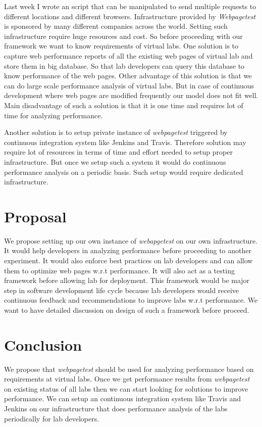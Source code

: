 \documentclass[a4paper,10pt]{article}
\begin{document}
Last week I wrote an script that can be manipulated to send multiple requests to different locations and different browsers.
Infrastructure provided by {\it Webpagetest} is sponsored by  many different companies across the world. Setting such infrastructure
require huge resources and cost. So before proceeding with our framework we want to know requirements of virtual labs.
One solution is to capture web performance reports of all the existing web pages of virtual lab and store them in big database.
So that lab developers can query this database to know performance of the web pages. Other advantage of this solution is that we
can do large scale performance analysis of virtual labs. But in case of continuous development where web pages are modified frequently
our model does not fit well. Main disadvantage of such a solution is that it is one time and requires lot of time for analyzing performance.

Another solution is to setup private instance of {\it webpagetest} triggered by continuous integration system like Jenkins and Travis.
Therefore solution may require lot of resources in terms of time and effort needed to setup proper infrastructure. But once we setup 
such a system it would do continuous performance analysis on a periodic basis. Such setup would require dedicated infrastructure.

\section{Proposal}
We propose setting up our own instance of {\it webapgetest} on our own infrastructure. It would help developers
in analyzing performance before proceeding to another experiment. It would also enforce best practices on lab developers
and can allow them to optimize web pages w.r.t performance. It will also act as a testing framework before allowing lab
for deployment. This framework would be major step in software development life cycle because lab developers would receive 
continuous feedback and recommendations to improve labs w.r.t performance. We want to have detailed discussion on design of
such a framework before proceed. 

\section{Conclusion}
We propose that {\it webpagetest} should be used for analyzing performance based on requirements at virtual labs. Once we get
performance results from {\it webpagetest} on existing status of all labs then we can start looking for solutions to improve performance.
We can setup an continuous integration system like Travis and Jenkins on our infrastructure that does performance analysis of the labs
periodically for lab developers. 
\end{document}
